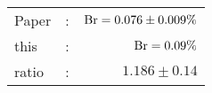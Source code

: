       \begin{tabular}{lcr}
          Paper &:& $\mathrm{Br}  = 0.076\pm 0.009\%$ \\
          this      &:& $\mathrm{Br}  = 0.09\%$ \\
		  ratio   &:& $1.186\pm 0.14$ \\
      \end{tabular}
